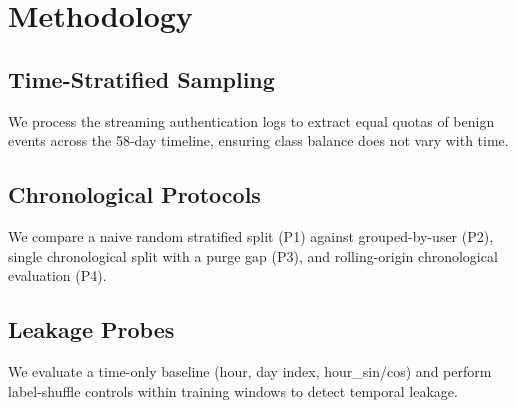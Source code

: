 \section{Methodology}
\subsection{Time-Stratified Sampling}
We process the streaming authentication logs to extract equal quotas of benign events across the 58-day timeline, ensuring class balance does not vary with time.

\subsection{Chronological Protocols}
We compare a naive random stratified split (P1) against grouped-by-user (P2), single chronological split with a purge gap (P3), and rolling-origin chronological evaluation (P4).

\subsection{Leakage Probes}
We evaluate a time-only baseline (hour, day index, hour\_sin/cos) and perform label-shuffle controls within training windows to detect temporal leakage.
